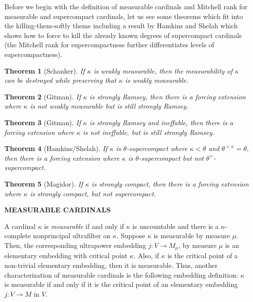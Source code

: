 \documentclass[10pt,leqno]{amsart}
\newtheorem{theorem}{Theorem}[]
\begin{document}
Before we begin with the definition of measurable cardinals and Mitchell rank for measurable and supercompact cardinals, let us see some theorems which fit into the killing-them-softly theme including a result by Hamkins and Shelah which shows how to force to kill the already known degrees of supercompact cardinals (the Mitchell rank for supercompactness further differentiates levels of supercompactness).

\begin{theorem}[Schanker]  If $\kappa$ is weakly measurable, then the measurability of $\kappa$ can be destroyed while preserving that $\kappa$ is weakly measurable. 
\end{theorem}

\begin{theorem}[Gitman]  If $\kappa$ is strongly Ramsey, then there is a forcing extension where $\kappa$ is not weakly measurable but is still strongly Ramsey.
\end{theorem}

\begin{theorem}[Gitman]  If $\kappa$ is strongly Ramsey and ineffable, then there is a forcing extension where $\kappa$ is not ineffable, but is still strongly Ramsey.
\end{theorem}

\begin{theorem}[Hamkins/Shelah]  If $\kappa$ is $\theta$-supercompact where $\kappa < \theta$ and $\theta^{< \kappa} = \theta$, then there is a forcing extension where $\kappa$ is $\theta$-supercompact but not $\theta^{+}$-supercompact.
\end{theorem}

\begin{theorem}[Magidor]  If $\kappa$ is strongly compact, then there is a forcing extension where $\kappa$ is strongly compact, but not supercompact. 
\end{theorem}

\vspace{.5 in}

\begin{center}\textbf{MEASURABLE CARDINALS} \end{center}
\vspace{.2 in}

A cardinal $\kappa$ is \textit{measurable} if and only if $\kappa$ is uncountable and there is a $\kappa$-complete nonprincipal ultrafilter on $\kappa$. Suppose $\kappa$ is measurable by measure $\mu$. Then, the corresponding ultrapower embedding $j:V \to M_{\mu}$, by measure $\mu$ is an elementary embedding with critical point $\kappa$. Also, if $\kappa$ is the critical point of a non-trivial elementary embedding, then it is measurable. Thus, another characterization of measurable cardinals is the following embedding definition: $\kappa$ is measurable if and only if it is the critical point of an elementary embedding $j:V \to M$ in $V$. 
\end{document}

